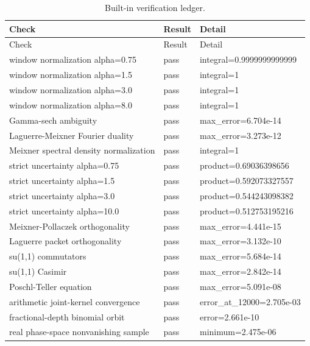 \begin{longtable}{L{0.42\textwidth}L{0.12\textwidth}L{0.37\textwidth}}
\caption{Built-in verification ledger.}\label{tab:checks}\\
\toprule Check & Result & Detail\\\midrule
\endfirsthead
\toprule Check & Result & Detail\\\midrule
\endhead
window normalization alpha=0.75 & pass & integral=0.9999999999999\\
window normalization alpha=1.5 & pass & integral=1\\
window normalization alpha=3.0 & pass & integral=1\\
window normalization alpha=8.0 & pass & integral=1\\
Gamma-sech ambiguity & pass & max\_error=6.704e-14\\
Laguerre-Meixner Fourier duality & pass & max\_error=3.273e-12\\
Meixner spectral density normalization & pass & integral=1\\
strict uncertainty alpha=0.75 & pass & product=0.69036398656\\
strict uncertainty alpha=1.5 & pass & product=0.592073327557\\
strict uncertainty alpha=3.0 & pass & product=0.544243098382\\
strict uncertainty alpha=10.0 & pass & product=0.512753195216\\
Meixner-Pollaczek orthogonality & pass & max\_error=4.441e-15\\
Laguerre packet orthogonality & pass & max\_error=3.132e-10\\
su(1,1) commutators & pass & max\_error=5.684e-14\\
su(1,1) Casimir & pass & max\_error=2.842e-14\\
Poschl-Teller equation & pass & max\_error=5.091e-08\\
arithmetic joint-kernel convergence & pass & error\_at\_12000=2.705e-03\\
fractional-depth binomial orbit & pass & error=2.661e-10\\
real phase-space nonvanishing sample & pass & minimum=2.475e-06\\
\bottomrule
\end{longtable}